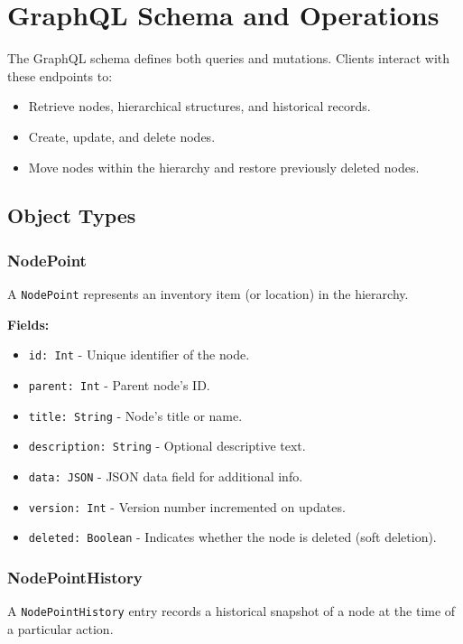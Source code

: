\documentclass[12pt,a4paper]{article}
\begin{document}
\section{GraphQL Schema and Operations}
The GraphQL schema defines both queries and mutations. Clients interact with these endpoints to:
\begin{itemize}
    \item Retrieve nodes, hierarchical structures, and historical records.
    \item Create, update, and delete nodes.
    \item Move nodes within the hierarchy and restore previously deleted nodes.
\end{itemize}

\subsection{Object Types}
\subsubsection{NodePoint}
A \texttt{NodePoint} represents an inventory item (or location) in the hierarchy.

\noindent \textbf{Fields:}
\begin{itemize}
    \item \texttt{id: Int} - Unique identifier of the node.
    \item \texttt{parent: Int} - Parent node’s ID.
    \item \texttt{title: String} - Node’s title or name.
    \item \texttt{description: String} - Optional descriptive text.
    \item \texttt{data: JSON} - JSON data field for additional info.
    \item \texttt{version: Int} - Version number incremented on updates.
    \item \texttt{deleted: Boolean} - Indicates whether the node is deleted (soft deletion).
\end{itemize}

\subsubsection{NodePointHistory}
A \texttt{NodePointHistory} entry records a historical snapshot of a node at the time of a particular action.
\end{document}
